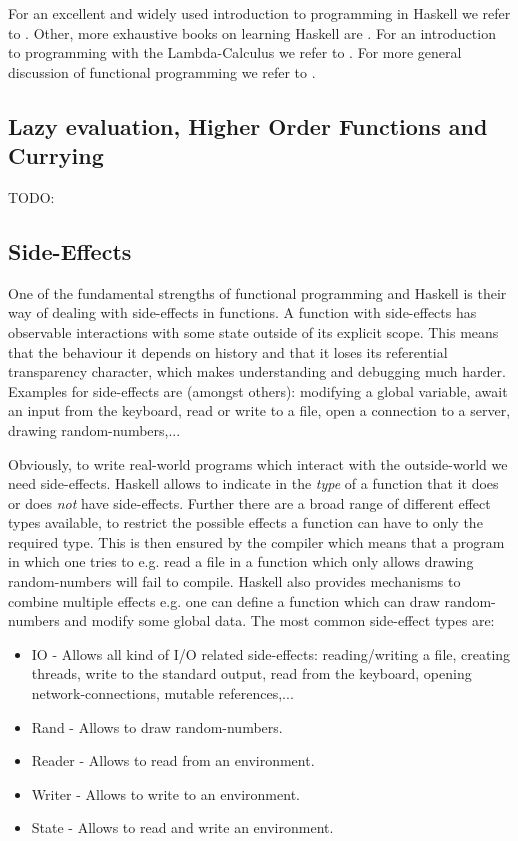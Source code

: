 For an excellent and widely used introduction to programming in Haskell we refer to \cite{hutton_programming_2016}. Other, more exhaustive books on learning Haskell are \cite{lipovaca_learn_2011, allen_haskell_2016}. For an introduction to programming with the Lambda-Calculus we refer to \cite{michaelson_introduction_2011}. For more general discussion of functional programming we refer to \cite{hughes_why_1989, maclennan_functional_1990, hudak_history_2007}.

\subsection{Lazy evaluation, Higher Order Functions and Currying}
TODO: 

\subsection{Side-Effects}
One of the fundamental strengths of functional programming and Haskell is their way of dealing with side-effects in functions. A function with side-effects has observable interactions with some state outside of its explicit scope. This means that the behaviour it depends on history and that it loses its referential transparency character, which makes understanding and debugging much harder. Examples for side-effects are (amongst others): modifying a global variable, await an input from the keyboard, read or write to a file, open a connection to a server, drawing random-numbers,...

Obviously, to write real-world programs which interact with the outside-world we need side-effects. Haskell allows to indicate in the \textit{type} of a function that it does or does \textit{not} have side-effects. Further there are a broad range of different effect types available, to restrict the possible effects a function can have to only the required type. This is then ensured by the compiler which means that a program in which one tries to e.g. read a file in a function which only allows drawing random-numbers will fail to compile. Haskell also provides mechanisms to combine multiple effects e.g. one can define a function which can draw random-numbers and modify some global data. The most common side-effect types are:
\begin{itemize}
	\item IO - Allows all kind of I/O related side-effects: reading/writing a file, creating threads, write to the standard output, read from the keyboard, opening network-connections, mutable references,... 
	\item Rand - Allows to draw random-numbers.
	\item Reader - Allows to read from an environment.
	\item Writer - Allows to write to an environment.
	\item State - Allows to read and write an environment.
\end{itemize}


